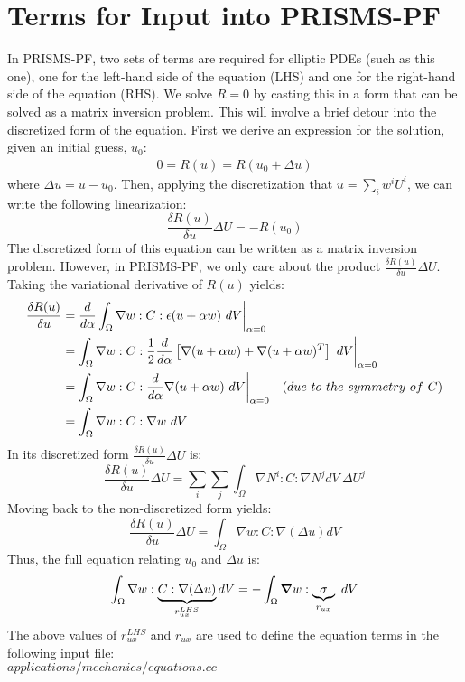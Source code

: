 \documentclass[10pt]{article}
\newcommand{\gv}[1]{\ensuremath{\mbox{\boldmath$ #1 $}}}
\newcommand{\grad}[1]{\gv{\nabla} #1}
\begin{document}
\section{Terms for Input into PRISMS-PF}
In PRISMS-PF, two sets of terms are required for elliptic PDEs (such as this one), one for the left-hand side of the equation (LHS) and one for the right-hand side of the equation (RHS). We solve $R=0$ by casting this in a form that can be solved as a matrix inversion problem. This will involve a brief detour into the discretized form of the equation. First we derive an expression for the solution, given an initial guess, $u_0$:
\begin{gather}
0 = R(u) = R(u_0 + \Delta u)
\end{gather}
where $\Delta u = u - u_0$. Then, applying the discretization that $u = \sum_i w^i U^i$, we can write the following linearization:
\begin{equation}
\frac{\delta R(u)}{\delta u} \Delta U = -R(u_0) \label{matrix_eqn}
\end{equation}
The discretized form of this equation can be written as a matrix inversion problem. However, in PRISMS-PF, we only care about the product $\frac{\delta R(u)}{\delta u} \Delta U$. Taking the variational derivative of $R(u)$ yields:
\begin{align}
\frac{\delta R(u)}{\delta u} &= \frac{d}{d\alpha} \int_{\Omega}   \nabla w :C: \epsilon (u+\alpha w) ~dV  \bigg{|}_{\alpha=0} \\
&=  \int_{\Omega}   \nabla w :C: \frac{1}{2}\frac{d}{d\alpha}\left[ \nabla(u+\alpha w) + \nabla(u+\alpha w)^T \right] ~dV \bigg{|}_{\alpha=0}\\
&= \int_{\Omega}   \nabla w :C: \frac{d}{d\alpha}\nabla(u+\alpha w)  ~dV \bigg{|}_{\alpha=0} \quad (due ~to ~the ~symmetry ~of ~C) \\
&= \int_{\Omega}   \nabla w :C: \nabla w  ~dV 
\end{align}
In its discretized form $\frac{\delta R(u)}{\delta u} \Delta U$ is:
\begin{equation}
\frac{\delta R(u)}{\delta u} \Delta U = \sum_i \sum_j \int_{\Omega} \nabla N^i : C : \nabla N^j dV ~\Delta U^j
\end{equation}
Moving back to the non-discretized form yields:
\begin{equation}
\frac{\delta R(u)}{\delta u} \Delta U = \int_{\Omega} \nabla w : C : \nabla (\Delta u) dV
\end{equation}
Thus, the full equation relating $u_0$ and $\Delta u$ is:
\begin{equation}
\int_{\Omega} \nabla w : \underbrace{C : \nabla (\Delta u)}_{r_{ux}^{LHS}} dV = -\int_{\Omega}   \grad w : \underbrace{\sigma}_{r_{ux}} ~dV
\end{equation}
The above values of $r_{ux}^{LHS}$ and $r_{ux}$ are used to define the equation terms in the following input file: \\
$applications/mechanics/equations.cc$
\end{document}
